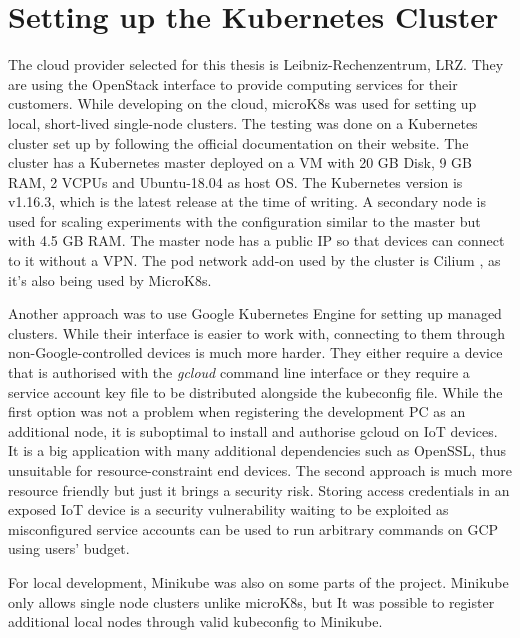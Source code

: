 \section{Setting up the Kubernetes Cluster}
The cloud provider selected for this thesis is Leibniz-Rechenzentrum, LRZ. They are using the OpenStack \cite{openstack} interface to provide computing services for their customers. While developing on the cloud, microK8s \cite{microk8s} was used for setting up local, short-lived single-node clusters. The testing was done on a Kubernetes cluster set up by following the official documentation on their website. The cluster has a Kubernetes master deployed on a VM with 20 GB Disk, 9 GB RAM, 2 VCPUs and Ubuntu-18.04 as host OS. The Kubernetes version is v1.16.3, which is the latest release at the time of writing. A secondary node is used for scaling experiments with the configuration similar to the master but with 4.5 GB RAM. The master node has a public IP so that devices can connect to it without a VPN. The pod network add-on used by the cluster is Cilium \cite{cilium}, as it's also being used by MicroK8s.

Another approach was to use Google Kubernetes Engine for setting up managed clusters. While their interface is easier to work with, connecting to them through non-Google-controlled devices is much more harder. They either require a device that is authorised with the \textit{gcloud} command line interface or they require a service account key file to be distributed alongside the kubeconfig file. While the first option was not a problem when registering the development PC as an additional node, it is suboptimal to install and authorise gcloud on IoT devices. It is a big application with many additional dependencies such as OpenSSL, thus unsuitable for resource-constraint end devices. The second approach is much more resource friendly but just it brings a security risk. Storing access credentials in an exposed IoT device is a security vulnerability waiting to be exploited as misconfigured service accounts can be used to run arbitrary commands on GCP using users' budget.

For local development, Minikube was also on some parts of the project. Minikube only allows single node clusters unlike microK8s, but It was possible to register additional local nodes through valid kubeconfig to Minikube.
